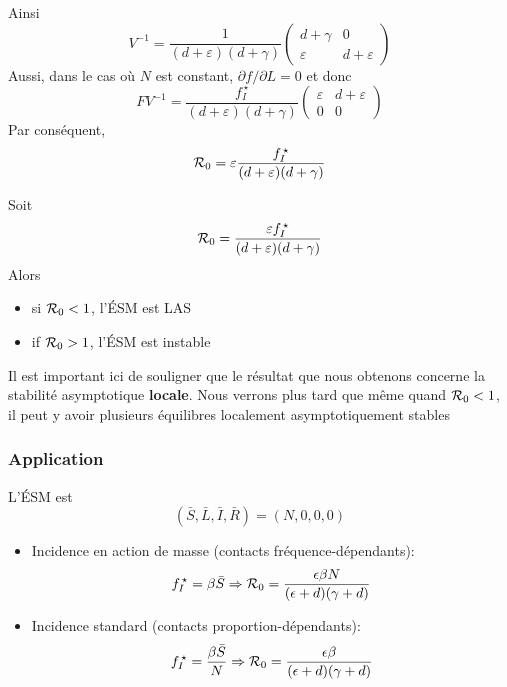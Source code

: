 \documentclass[aspectratio=169]{beamer}\usepackage[]{graphicx}\usepackage[]{xcolor}
\begin{document}
\begin{frame}
Ainsi
\[
V^{-1}=\frac{1}{(d+\varepsilon)(d+\gamma)}
\left(
\begin{matrix}
d+\gamma & 0 \\
\varepsilon & d+\varepsilon
\end{matrix}
\right)
\]
\vfill
Aussi, dans le cas où $N$ est constant, $\partial f/\partial L=0$ et donc
\[
FV^{-1}=\frac{f_I^{\,\star}}
{(d+\varepsilon)(d+\gamma)}
\left(
\begin{matrix}
\varepsilon 
& d+\varepsilon  \\
0 & 0
\end{matrix}
\right)
\]
\vfill
Par conséquent,
\[
\mathcal{R}_0=\varepsilon
\frac{f_I^{\,\star}}
{(d+\varepsilon)(d+\gamma)}
\]
\end{frame}


\begin{frame}
\begin{theorem}\label{th:R0_SEIRS}
Soit
\begin{equation}\label{eq:R0_SEIRS}
\mathcal{R}_0=
\frac{\varepsilon f_I^{\,\star}}
{(d+\varepsilon)(d+\gamma)}
\end{equation}
Alors
\begin{itemize}
\item si $\mathcal{R}_0<1$, l'ÉSM est LAS
\item if $\mathcal{R}_0>1$, l'ÉSM est instable
\end{itemize}
\end{theorem}
\vfill
Il est important ici de souligner que le résultat que nous obtenons concerne la stabilité asymptotique \textbf{locale}. Nous verrons plus tard que même quand $\mathcal{R}_0<1$, il peut y avoir plusieurs équilibres localement asymptotiquement stables
\end{frame}


\begin{frame}
\frametitle{Application}
L'ÉSM est
\[
(\bar S,\bar L,\bar I,\bar R)=(N,0,0,0)
\]
\begin{itemize}
\item Incidence en action de masse (contacts fréquence-dépendants):
 \[
f_I^{\,\star}=\beta\bar S \Rightarrow\mathcal{R}_0 =
\frac{\epsilon\beta N}{(\epsilon+d)(\gamma+d)} 
\]
\item Incidence standard (contacts proportion-dépendants):
\[
f_I^{\,\star}=\frac{\beta\bar S}{N}
\Rightarrow\mathcal{R}_0 = \frac{\epsilon\beta}{(\epsilon+d)(\gamma+d)}
\]
\end{itemize}
\end{frame}
\end{document}
